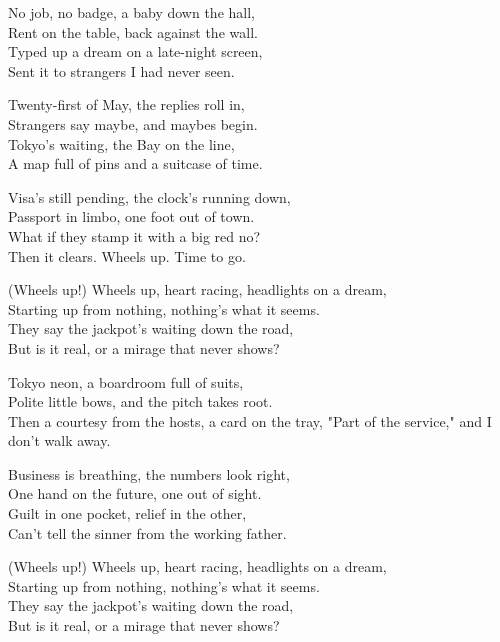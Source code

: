 \begin{lyrics}
No job, no badge, a baby down the hall,\\
Rent on the table, back against the wall.\\
Typed up a dream on a late-night screen,\\
Sent it to strangers I had never seen.

Twenty-first of May, the replies roll in,\\
Strangers say maybe, and maybes begin.\\
Tokyo's waiting, the Bay on the line,\\
A map full of pins and a suitcase of time.

Visa's still pending, the clock's running down,\\
Passport in limbo, one foot out of town.\\
What if they stamp it with a big red no?\\
Then it clears. Wheels up. Time to go.

(Wheels up!) Wheels up, heart racing, headlights on a dream,\\
Starting up from nothing, nothing's what it seems.\\
They say the jackpot's waiting down the road,\\
But is it real, or a mirage that never shows?

Tokyo neon, a boardroom full of suits,\\
Polite little bows, and the pitch takes root.\\
Then a courtesy from the hosts, a card on the tray,
"Part of the service," and I don't walk away.

Business is breathing, the numbers look right,\\
One hand on the future, one out of sight.\\
Guilt in one pocket, relief in the other,\\
Can't tell the sinner from the working father.

(Wheels up!) Wheels up, heart racing, headlights on a dream,\\
Starting up from nothing, nothing's what it seems.\\
They say the jackpot's waiting down the road,\\
But is it real, or a mirage that never shows?


\end{lyrics}
